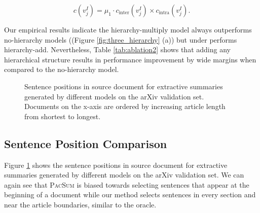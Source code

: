 \documentclass[11pt,a4paper]{article}
\begin{document}
  \begin{equation}\label{eq:importance_mul}
        c(v^I_j) = \mu_1 \cdot c_{\text{inter}}(v^I_j) \times c_{\text{intra}}(v^I_j).
    \end{equation}

\begin{table}[ht!]
\centering
{}
\caption{\label{tab:ablation2} \small Results on the PubMed validation set with different positional function or different hierarchical information.}
\end{table}


Our empirical results indicate the hierarchy-multiply model always outperforms no-hierarchy models ((Figure \ref{fig:three_hierarchy} (a)) but under performs hierarchy-add.
Nevertheless, Table \ref{tab:ablation2} shows that adding any hierarchical structure results in performance improvement by wide margins when compared to the no-hierarchy  model. 


 \newpage  
 \begin{figure}[!hbt]
      \centering
       \hfill
       \hfill
      \hfill
    \caption{Sentence positions in source document for extractive summaries generated by different models on the arXiv validation set. Documents on the x-axis are ordered by increasing article length from shortest to longest.}
    \label{fig:oracle_density_plot_arxiv}
    \end{figure}
\subsection{Sentence Position Comparison}

Figure \ref{fig:oracle_density_plot_arxiv} shows the sentence positions in source document for extractive summaries generated by different models on the arXiv validation set. We can again see that \textsc{PacSum} is biased towards selecting sentences that appear at the beginning of a document while our  method selects sentences in every section and near the article boundaries, similar to the oracle. 
    
    
 
\end{document}
